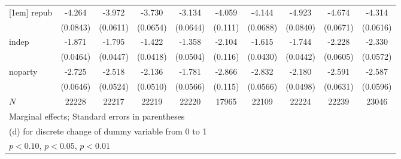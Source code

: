 {\begin{tabular}{l*{9}{c}}
[1em]
repub       &      -4.264\sym{***}&      -3.972\sym{***}&      -3.730\sym{***}&      -3.134\sym{***}&      -4.059\sym{***}&      -4.144\sym{***}&      -4.923\sym{***}&      -4.674\sym{***}&      -4.314\sym{***}\\
            &    (0.0843)         &    (0.0611)         &    (0.0654)         &    (0.0644)         &     (0.111)         &    (0.0688)         &    (0.0840)         &    (0.0671)         &    (0.0616)         \\
[1em]
indep       &      -1.871\sym{***}&      -1.795\sym{***}&      -1.422\sym{***}&      -1.358\sym{***}&      -2.104\sym{***}&      -1.615\sym{***}&      -1.744\sym{***}&      -2.228\sym{***}&      -2.330\sym{***}\\
            &    (0.0464)         &    (0.0447)         &    (0.0418)         &    (0.0504)         &     (0.116)         &    (0.0430)         &    (0.0442)         &    (0.0605)         &    (0.0572)         \\
[1em]
noparty     &      -2.725\sym{***}&      -2.518\sym{***}&      -2.136\sym{***}&      -1.781\sym{***}&      -2.866\sym{***}&      -2.832\sym{***}&      -2.180\sym{***}&      -2.591\sym{***}&      -2.587\sym{***}\\
            &    (0.0646)         &    (0.0524)         &    (0.0510)         &    (0.0566)         &     (0.115)         &    (0.0566)         &    (0.0498)         &    (0.0631)         &    (0.0596)         \\
\hline
\(N\)       &       22228         &       22217         &       22219         &       22220         &       17965         &       22109         &       22224         &       22239         &       23046         \\
\hline\hline
\multicolumn{10}{l}{\footnotesize Marginal effects; Standard errors in parentheses}\\
\multicolumn{10}{l}{\footnotesize  (d) for discrete change of dummy variable from 0 to 1}\\
\multicolumn{10}{l}{\footnotesize \sym{*} \(p<0.10\), \sym{**} \(p<0.05\), \sym{***} \(p<0.01\)}\\
\end{tabular}
}
